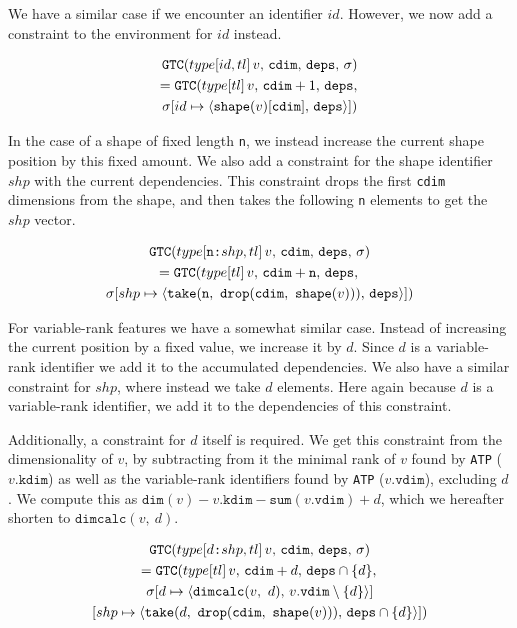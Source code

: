 \documentclass[sigconf,screen]{acmart}
\newcommand{\tpnum}{\texttt{n}}
\newcommand{\tpnumshp}[2][\texttt{n}]{#1\texttt{:}#2}
\newcommand{\tpidshp}[2]{#1\texttt{:}#2}
\newcommand{\rest}{\ensuremath{tl}}
\newcommand{\fdim}{\texttt{kdim}}
\newcommand{\vdim}{\texttt{vdim}}
\newcommand{\gtc}[4]{\ensuremath{\texttt{GTC}(#1\,v,\,#2,\,#3,\,#4)}}
\newcommand{\cdim}{\texttt{cdim}}
\newcommand{\deps}{\texttt{deps}}
\newcommand{\cenv}{\ensuremath{\sigma{}}}
\newcommand{\envmap}[3]{\ensuremath{[#1\mapsto\langle{}#3,\,#2\rangle{}]}}
\begin{document}
We have a similar case if we encounter an identifier $id$.
However, we now add a constraint to the environment for $id$ instead.

\begin{gather*}
    \gtc{type[id,\rest]}{\cdim}{\deps}{\cenv} \\
        = \gtc{type[\rest]}{\cdim+1}{\deps}{ \\ \cenv
            \envmap{id}{\deps}{\texttt{shape}(v)[\cdim]}}
\end{gather*}

In the case of a shape of fixed length \tpnum{}, we instead increase the current shape position by this fixed amount.
We also add a constraint for the shape identifier $shp$ with the current dependencies.
This constraint drops the first \cdim{} dimensions from the shape, and then takes the following \tpnum{} elements to get the $shp$ vector.

\begin{gather*}
  \gtc{type[\tpnumshp{shp},\rest]}{\cdim}{\deps}{\cenv} \\
    = \gtc{type[\rest]}{\cdim+\tpnum}{\deps}{ \\ \cenv
      \envmap{shp}{\deps}{\texttt{take}(\tpnum,\ \texttt{drop}(\cdim,\ \texttt{shape}(v)))}}
\end{gather*}

For variable-rank features we have a somewhat similar case.
Instead of increasing the current position by a fixed value, we increase it by $d$.
Since $d$ is a variable-rank identifier we add it to the accumulated dependencies.
We also have a similar constraint for $shp$, where instead we take $d$ elements.
Here again because $d$ is a variable-rank identifier, we add it to the dependencies of this constraint.

Additionally, a constraint for $d$ itself is required.
We get this constraint from the dimensionality of $v$, by subtracting from it the minimal rank of $v$ found by \texttt{ATP} ($v.\fdim$) as well as the variable-rank identifiers found by \texttt{ATP} ($v.\vdim$), excluding $d$.
We compute this as $\texttt{dim}(v) - v.\fdim - \texttt{sum}(v.\vdim) + d$, which we hereafter shorten to $\texttt{dimcalc}(v,\ d)$.

\begin{gather*}
  \gtc{type[\tpidshp{d}{shp},\rest]}{\cdim}{\deps}{\cenv} \\
    = \gtc{type[\rest]}{\cdim+d}{\deps \cap \{d\}}{ \\ \cenv
      \envmap{d}{v.\vdim \setminus \{d\}}{\texttt{dimcalc}(v,\ d)} \\
      \envmap{shp}{\deps \cap \{d\}}{\texttt{take}(d,\ \texttt{drop}(\cdim,\ \texttt{shape}(v)))}}
\end{gather*}
\end{document}
